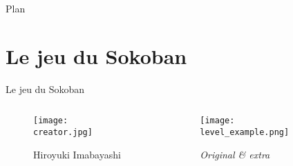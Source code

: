 




    \maketitle

    \begin{frame}{Plan}
        \tableofcontents%
    \end{frame}

    \section{Le jeu du Sokoban}
        \begin{frame}{Le jeu du Sokoban}
            \begin{columns}
                \begin{column}{0.3\textwidth}
                    \begin{figure}
                        \centering
                        \texttt{[image: creator.jpg]} %
                        \caption*{Hiroyuki Imabayashi}
                    \end{figure}
                \end{column}
                \begin{column}{0.7\textwidth}
                    \begin{figure}
                        \centering
                        \texttt{[image: level\_example.png]}
                        \caption*{\textit{Original \& extra}}
                    \end{figure}
                \end{column}
            \end{columns}
        \end{frame}


